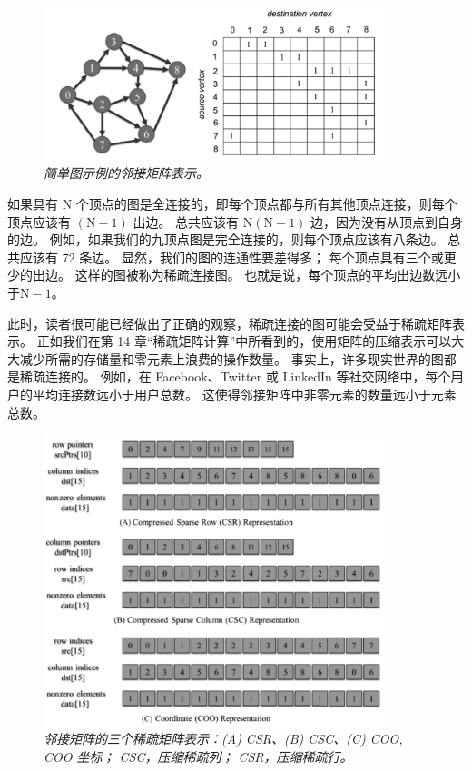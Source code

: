 \begin{figure}[H]
	\centering
	\includegraphics[width=0.9\textwidth]{figs/F15.2.png}
	\caption{\textit{简单图示例的邻接矩阵表示。}}
\end{figure}

如果具有 $\mathrm{N}$ 个顶点的图是全连接的，即每个顶点都与所有其他顶点连接，则每个顶点应该有 $(\mathrm{N}-1)$ 出边。 
总共应该有 $\mathrm{N}(\mathrm{N}-1)$ 边，因为没有从顶点到自身的边。 
例如，如果我们的九顶点图是完全连接的，则每个顶点应该有八条边。 总共应该有 72 条边。 
显然，我们的图的连通性要差得多； 每个顶点具有三个或更少的出边。 这样的图被称为稀疏连接图。 
也就是说，每个顶点的平均出边数远小于$\mathrm{N}-1$。

此时，读者很可能已经做出了正确的观察，稀疏连接的图可能会受益于稀疏矩阵表示。 
正如我们在第 14 章“稀疏矩阵计算”中所看到的，使用矩阵的压缩表示可以大大减少所需的存储量和零元素上浪费的操作数量。 
事实上，许多现实世界的图都是稀疏连接的。 
例如，在 Facebook、Twitter 或 LinkedIn 等社交网络中，每个用户的平均连接数远小于用户总数。 
这使得邻接矩阵中非零元素的数量远小于元素总数。

\begin{figure}[H]
	\centering
	\includegraphics[width=0.9\textwidth]{figs/F15.3.png}
	\caption{\textit{邻接矩阵的三个稀疏矩阵表示：(A) CSR、(B) CSC、(C) COO, 
	COO 坐标； CSC，压缩稀疏列； CSR，压缩稀疏行。}}
\end{figure}


